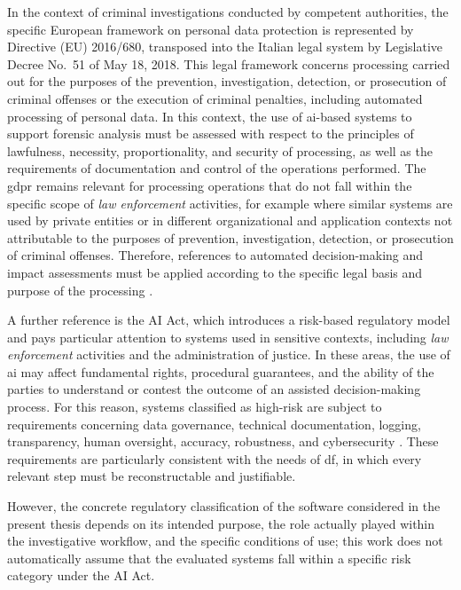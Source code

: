 In the context of criminal investigations conducted by competent authorities,
the specific European framework on personal data protection is represented by
Directive (EU) 2016/680, transposed into the Italian legal system by
Legislative Decree No.~51 of May 18, 2018. This legal framework concerns
processing carried out for the purposes of the prevention, investigation,
detection, or prosecution of criminal offenses or the execution of criminal
penalties, including automated processing of personal data. In this context,
the use of \gls{ai}-based systems to support forensic analysis must be assessed with
respect to the principles of lawfulness, necessity, proportionality, and
security of processing, as well as the requirements of documentation and
control of the operations performed. The \gls{gdpr} remains relevant for
processing operations that do not fall within the specific scope of
\textit{law enforcement} activities, for example where similar systems are used
by private entities or in different organizational and application contexts not
attributable to the purposes of prevention, investigation, detection, or
prosecution of criminal offenses. Therefore, references to automated
decision-making and impact assessments must be applied according to the
specific legal basis and purpose of the processing
\cite{directive2016led,dlgs2018_51,gdpr2016}.

A further reference is the AI Act, which introduces a risk-based regulatory
model and pays particular attention to systems used in sensitive contexts,
including \textit{law enforcement} activities and the administration of
justice. In these areas, the use of \gls{ai} may affect fundamental rights,
procedural guarantees, and the ability of the parties to understand or contest
the outcome of an assisted decision-making process. For this reason, systems
classified as high-risk are subject to requirements concerning data governance,
technical documentation, logging, transparency, human oversight, accuracy,
robustness, and cybersecurity \cite{aiact2024}. These requirements are
particularly consistent with the needs of \gls{df}, in which every relevant
step must be reconstructable and justifiable.

However, the concrete regulatory classification of the software considered in
the present thesis depends on its intended purpose, the role actually played
within the investigative workflow, and the specific conditions of use; this
work does not automatically assume that the evaluated systems fall within a
specific risk category under the AI Act.

